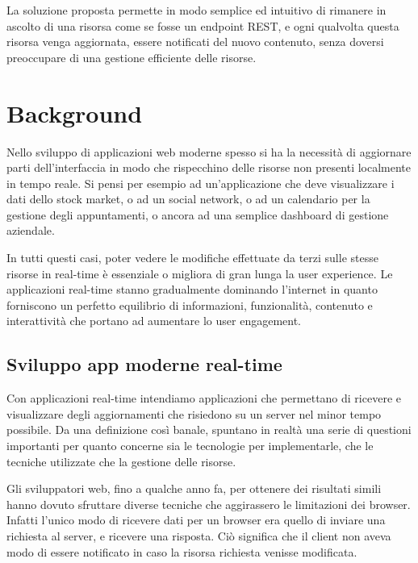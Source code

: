 \documentclass[12pt,a4paper,openright]{report}
\begin{document}
\bigskip

La soluzione proposta permette in modo semplice ed intuitivo di rimanere in ascolto di una risorsa come se fosse un endpoint REST, e ogni qualvolta questa risorsa venga aggiornata, essere notificati del nuovo contenuto, senza doversi preoccupare di una gestione efficiente delle risorse.

\chapter{Background}
\lhead[\fancyplain{}{\bfseries\thepage}]{\fancyplain{}{\bfseries\rightmark}}

Nello sviluppo di applicazioni web moderne spesso si ha la necessità di aggiornare parti dell’interfaccia in modo che rispecchino delle risorse non presenti localmente in tempo reale. Si pensi per esempio ad un’applicazione che deve visualizzare i dati dello stock market, o ad un social network, o ad un calendario per la gestione degli appuntamenti, o ancora ad una semplice dashboard di gestione aziendale. 

\bigskip

In tutti questi casi, poter vedere le modifiche effettuate da terzi sulle stesse risorse in real-time è essenziale o migliora di gran lunga la user experience. Le applicazioni real-time stanno gradualmente dominando l’internet in quanto forniscono un perfetto equilibrio di informazioni, funzionalità, contenuto e interattività che portano ad aumentare lo user engagement.

\section{Sviluppo app moderne real-time}\label{sec_appmoderne}

Con applicazioni real-time intendiamo applicazioni che permettano di ricevere e visualizzare degli aggiornamenti che risiedono su un server nel minor tempo possibile. Da una definizione così banale, spuntano in realtà una serie di questioni importanti per quanto concerne sia le tecnologie per implementarle, che le tecniche utilizzate che la gestione delle risorse.

\bigskip

Gli sviluppatori web, fino a qualche anno fa, per ottenere dei risultati simili hanno dovuto sfruttare diverse tecniche che aggirassero le limitazioni dei browser. Infatti l’unico modo di ricevere dati per un browser era quello di inviare una richiesta al server, e ricevere una risposta. Ciò significa che il client non aveva modo di essere notificato in caso la risorsa richiesta venisse modificata.
\end{document}

